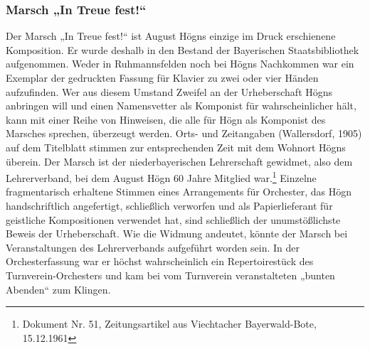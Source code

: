 \documentclass[a4paper]{article}
\begin{document}
\subsubsection{Marsch „In Treue fest!“}
\hypertarget{RefHeadingToc100333754}{} Der Marsch „In Treue fest!“ ist
August Högns einzige im Druck erschienene Komposition. Er wurde deshalb
in den Bestand der Bayerischen Staatsbibliothek aufgenommen. Weder in
Ruhmannsfelden noch bei Högns Nachkommen war ein Exemplar der
gedruckten Fassung für Klavier zu zwei oder vier Händen aufzufinden.
Wer aus diesem Umstand Zweifel an der Urheberschaft Högns anbringen
will und einen Namensvetter als Komponist für wahrscheinlicher hält,
kann mit einer Reihe von Hinweisen, die alle für Högn als Komponist des
Marsches sprechen, überzeugt werden. Orts- und Zeitangaben
(Wallersdorf, 1905) auf dem Titelblatt stimmen zur entsprechenden Zeit
mit dem Wohnort Högns überein. Der Marsch ist der niederbayerischen
Lehrerschaft gewidmet, also dem Lehrerverband, bei dem August Högn 60
Jahre Mitglied war.\footnote{ Dokument Nr. 51, Zeitungsartikel aus
Viechtacher Bayerwald-Bote, 15.12.1961} Einzelne fragmentarisch
erhaltene Stimmen eines Arrangements für Orchester, das Högn
handschriftlich angefertigt, schließlich verworfen und als
Papierlieferant für geistliche Kompositionen verwendet hat, sind
schließlich der unumstößlichste Beweis der Urheberschaft. Wie die
Widmung andeutet, könnte der Marsch bei Veranstaltungen des
Lehrerverbands aufgeführt worden sein. In der Orchesterfassung war er
höchst wahrscheinlich ein Repertoirestück des Turnverein-Orchesters und
kam bei vom Turnverein veranstalteten „bunten Abenden“ zum Klingen.
\end{document}
